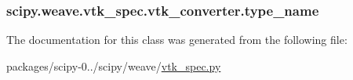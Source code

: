 \subsubsection[{type\+\_\+name}]{\setlength{\rightskip}{0pt plus 5cm}scipy.\+weave.\+vtk\+\_\+spec.\+vtk\+\_\+converter.\+type\+\_\+name}\label{classscipy_1_1weave_1_1vtk__spec_1_1vtk__converter_a3770e04e4cb7f48d5c6f91287f86d129}


The documentation for this class was generated from the following file\+:\begin{DoxyCompactItemize}
\item 
packages/scipy-\/0../scipy/weave/\hyperlink{vtk__spec_8py}{vtk\+\_\+spec.\+py}\end{DoxyCompactItemize}
